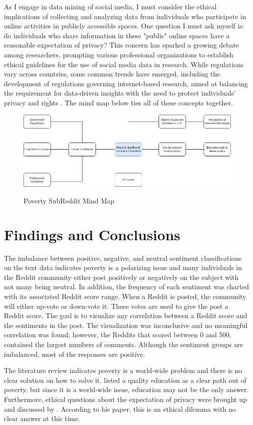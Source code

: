 \documentclass[stu,12pt,floatsintext]{apa7}
\begin{document}
\indent As I engage in data mining of social media, I must consider the ethical implications of collecting and analyzing data from individuals who participate in online activities in publicly accessible spaces. One question I must ask myself is: do individuals who share information in these "public" online spaces have a reasonable expectation of privacy? This concern has sparked a growing debate among researchers, prompting various professional organizations to establish ethical guidelines for the use of social media data in research. While regulations vary across countries, some common trends have emerged, including the development of regulations governing internet-based research, aimed at balancing the requirement for data-driven insights with the need to protect individuals' privacy and rights \citep{fiesler2024}.  The mind map below ties all of these concepts together.
\begin{figure}[H]
	\centering
	\caption{Poverty SubReddit Mind Map}
	\includegraphics[width=0.75\linewidth]{figures/mindMapPoverty.png}
	\label{fig:mind_map}
\end{figure}
\section{Findings and Conclusions}
\indent The imbalance between positive, negative, and neutral sentiment classifications on the text data indicates poverty is a polarizing issue and many individuals in the Reddit community either post positively or negatively on the subject with not many being neutral.  In addition, the frequency of each sentiment was charted with its associated Reddit score range.  When a Reddit is posted, the community will either up-vote or down-vote it.  These votes are used to give the post a Reddit score.  The goal is to visualize any correlation between a Reddit score and the sentiments in the post.  The visualization was inconclusive and no meaningful correlation was found; however, the Reddits that scored between 0 and 500, contained the largest numbers of comments.  Although the sentiment groups are imbalanced, most of the responses are positive.

\indent The literature review indicates poverty is a world-wide problem and there is no clear solution on how to solve it.  \citet{tackie2021} listed a quality education as a clear path out of poverty, but since it is a world-wide issue, education may not be the only answer.  Furthermore, ethical questions about the expectation of privacy were brought up and discussed by \citet{fiesler2024}.  According to his paper, this is an ethical dilemma with no clear answer at this time.    

\end{document}

